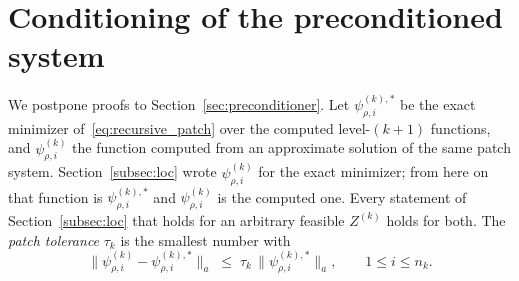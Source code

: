 \documentclass[hidelinks]{siamart}
\theoremstyle{nonumberplain}
\numberwithin{theorem}{section}
\begin{document}
\section{Conditioning of the preconditioned system}
\label{sec:results}
\label{sec:main_bounds}

We postpone proofs to Section~\ref{sec:preconditioner}.  Let $\psi^{(k),\ast}_{\rho,i}$ be the exact minimizer
of~\eqref{eq:recursive_patch} over the computed level-$(k{+}1)$
functions, and $\psi^{(k)}_{\rho,i}$ the function computed from an
approximate solution of the same patch system.  Section~\ref{subsec:loc}
wrote $\psi^{(k)}_{\rho,i}$ for the exact minimizer; from here on that
function is $\psi^{(k),\ast}_{\rho,i}$ and $\psi^{(k)}_{\rho,i}$ is the
computed one.  Every statement of Section~\ref{subsec:loc} that holds for
an arbitrary feasible $Z^{(k)}$ holds for both.  The \emph{patch
tolerance} $\tau_k$ is the smallest number with
\begin{equation}\label{eq:tau_def}
  \bigl\| \psi^{(k)}_{\rho,i} - \psi^{(k),\ast}_{\rho,i} \bigr\|_a
  \;\leq\; \tau_k\, \bigl\| \psi^{(k),\ast}_{\rho,i} \bigr\|_a ,
  \qquad 1 \leq i \leq n_k .
\end{equation}
\end{document}
